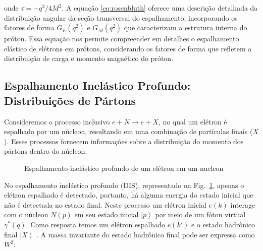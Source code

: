 onde $\tau = -q^2/4M^2$. A equação \eqref{eq:rosenbluth} oferece uma descrição detalhada da distribuição angular da seção transversal do espalhamento, incorporando os fatores de forma $G_E(q^2)$ e $G_M(q^2)$ que caracterizam a estrutura interna do próton. Essa equação nos permite compreender em detalhes o espalhamento elástico de elétrons em prótons, considerando os fatores de forma que refletem a distribuição de carga e momento magnético do próton.

\subsection{Espalhamento Inelástico Profundo: Distribuições de Pártons}


Consideremos o processo inclusivo \( e + N \rightarrow e + X \), no qual um elétron é espalhado por um núcleon, resultando em uma combinação de partículas finais (\( X \)). Esses processos fornecem informações sobre a distribuição do momento dos pártons dentro do núcleon.
\begin{figure}[!ht]
    \centering
    \caption{Espalhamento inelástico profundo de um elétron em um nucleon }
    \label{fig:dis}
\end{figure}

No espalhamento inelástico profundo (DIS), representado na Fig.~\ref{fig:dis}, apenas o elétron espalhado é detectado, portanto, há alguma energia do estado inicial que não é detectada no estado final. Neste processo um elétron inicial \( e(k) \) interage com o núcleon $N(p)$ em seu estado inicial \( \left| p \right\rangle \) por meio de um fóton virtual \( \gamma^*(q) \). Como resposta temos um elétron espalhado \( e(k') \) e o estado hadrônico final \( \left| X \right\rangle \) . A massa invariante do estado hadrônico final pode ser expressa como \( W^2 \):

